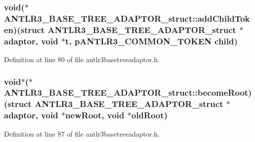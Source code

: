 \hypertarget{struct_a_n_t_l_r3___b_a_s_e___t_r_e_e___a_d_a_p_t_o_r__struct_a0baae1cea0bbdd8ee2909d3e91ab544a}{
\subsubsection[{add\-Child\-Token}]{\setlength{\rightskip}{0pt plus 5cm}void($\ast$ A\-N\-T\-L\-R3\-\_\-\-B\-A\-S\-E\-\_\-\-T\-R\-E\-E\-\_\-\-A\-D\-A\-P\-T\-O\-R\-\_\-struct\-::add\-Child\-Token)(struct {\bf A\-N\-T\-L\-R3\-\_\-\-B\-A\-S\-E\-\_\-\-T\-R\-E\-E\-\_\-\-A\-D\-A\-P\-T\-O\-R\-\_\-struct} $\ast$adaptor, void $\ast${\bf t}, {\bf p\-A\-N\-T\-L\-R3\-\_\-\-C\-O\-M\-M\-O\-N\-\_\-\-T\-O\-K\-E\-N} child)}}\label{struct_a_n_t_l_r3___b_a_s_e___t_r_e_e___a_d_a_p_t_o_r__struct_a0baae1cea0bbdd8ee2909d3e91ab544a}


Definition at line 80 of file antlr3basetreeadaptor.\-h.

\hypertarget{struct_a_n_t_l_r3___b_a_s_e___t_r_e_e___a_d_a_p_t_o_r__struct_a2433dcf8544c3c5e8168494f81f411cf}{
\subsubsection[{become\-Root}]{\setlength{\rightskip}{0pt plus 5cm}void$\ast$($\ast$ A\-N\-T\-L\-R3\-\_\-\-B\-A\-S\-E\-\_\-\-T\-R\-E\-E\-\_\-\-A\-D\-A\-P\-T\-O\-R\-\_\-struct\-::become\-Root)(struct {\bf A\-N\-T\-L\-R3\-\_\-\-B\-A\-S\-E\-\_\-\-T\-R\-E\-E\-\_\-\-A\-D\-A\-P\-T\-O\-R\-\_\-struct} $\ast$adaptor, void $\ast$new\-Root, void $\ast$old\-Root)}}\label{struct_a_n_t_l_r3___b_a_s_e___t_r_e_e___a_d_a_p_t_o_r__struct_a2433dcf8544c3c5e8168494f81f411cf}


Definition at line 87 of file antlr3basetreeadaptor.\-h.

